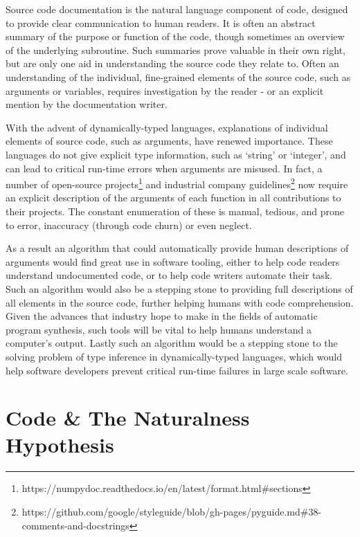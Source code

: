Source code documentation is the natural language component of code, designed to provide clear communication to human readers.
It is often an abstract summary of the purpose or function of the code, though sometimes an overview of the underlying subroutine.
Such summaries prove valuable in their own right, but are only one aid in understanding the source code they relate to.
Often an understanding of the individual, fine-grained elements of the source code, such as arguments or variables, requires investigation by the reader  - or an explicit mention by the documentation writer.

With the advent of dynamically-typed languages, explanations of individual elements of source code, such as arguments, have renewed importance.
These languages do not give explicit type information, such as `string' or `integer', and can lead to critical run-time errors when arguments are misused. 
In fact, a number of open-source projects\footnote{https://numpydoc.readthedocs.io/en/latest/format.html\#sections} and industrial company guidelines\footnote{https://github.com/google/styleguide/blob/gh-pages/pyguide.md\#38-comments-and-docstrings} now require an explicit description of the arguments of each function in all contributions to their projects.
The constant enumeration of these is manual, tedious, and prone to error, inaccuracy (through code churn) or even neglect.

As a result an algorithm that could automatically provide human descriptions of arguments would find great use in software tooling, either to help code readers understand undocumented code, or to help code writers automate their task.
Such an algorithm would also be a stepping stone to providing full descriptions of all elements in the source code, further helping humans with code comprehension.
Given the advances that industry hope to make in the fields of automatic program synthesis, such tools will be vital to help humans understand
a computer's output.
Lastly such an algorithm would be a stepping stone to the solving problem of type inference in dynamically-typed languages, which would help software developers prevent critical run-time failures in large scale software.



\section{Code \& The Naturalness Hypothesis} %
\label{sec:code_and_natural_language}

